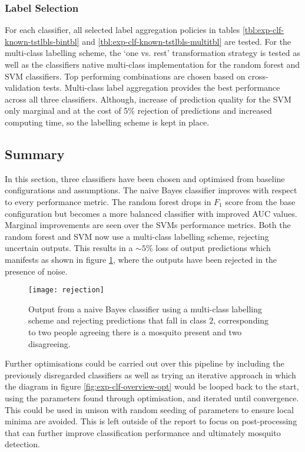         \subsubsection{Label Selection}
        \label{subsubsec:exp-clf-opt-label}
            For each classifier, all selected label aggregation policies in tables \ref{tbl:exp-clf-known-tstlbls-bintbl} and \ref{tbl:exp-clf-known-tstlbls-multitbl} are tested. For the multi-class labelling scheme, the `one vs. rest' transformation strategy is tested as well as the classifiers native multi-class implementation for the random forest and SVM classifiers. Top performing combinations are chosen based on cross-validation tests. Multi-class label aggregation provides the best performance across all three classifiers. Although, increase of prediction quality for the SVM only marginal and at the cost of 5\% rejection of predictions and increased computing time, so the  labelling scheme is kept in place.

    \subsection{Summary}
    \label{subsec:exp-clf-summary}
        In this section, three classifiers have been chosen and optimised from baseline configurations and assumptions. The naive Bayes classifier improves with respect to every performance metric. The random forest drops in $F_{1}$ score from the base configuration but becomes a more balanced classifier with improved AUC values. Marginal improvements are seen over the SVMs performance metrics. Both the random forest and SVM now use a multi-class labelling scheme, rejecting uncertain outputs. This results in a $\sim5\%$ loss of output predictions which manifests as shown in figure \ref{fig:exp-clf-summary-rej}, where the outputs have been rejected in the presence of noise.
        \begin{figure}[ht]
            \centering
            \texttt{[image: rejection]}
            \caption{Output from a naive Bayes classifier using a multi-class labelling scheme and rejecting predictions that fall in class $2$, corresponding to two people agreeing there is a mosquito present and two disagreeing.}
            \label{fig:exp-clf-summary-rej}
        \end{figure}
        Further optimisations could be carried out over this pipeline by including the previously disregarded classifiers as well as trying an iterative approach in which the diagram in figure \ref{fig:exp-clf-overview-opt} would be looped back to the start, using the parameters found through optimisation, and iterated until convergence. This could be used in unison with random seeding of parameters to ensure local minima are avoided. This is left outside of the report to focus on post-processing that can further improve classification performance and ultimately mosquito detection.